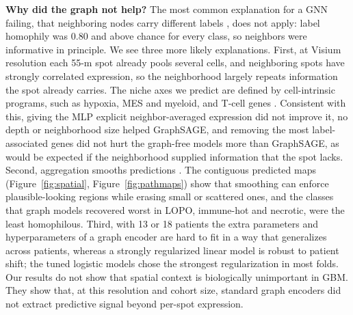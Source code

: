 \documentclass[11pt,letterpaper]{article}
\begin{document}
\textbf{Why did the graph not help?} The most common explanation for a GNN failing, that neighboring nodes carry different labels \cite{zhu2020homophily}, does not apply: label homophily was 0.80 and above chance for every class, so neighbors were informative in principle. We see three more likely explanations. First, at Visium resolution each 55-\textmu m spot already pools several cells, and neighboring spots have strongly correlated expression, so the neighborhood largely repeats information the spot already carries. The niche axes we predict are defined by cell-intrinsic programs, such as hypoxia, MES and myeloid, and T-cell genes \cite{neftel2019,greenwald2024}. Consistent with this, giving the MLP explicit neighbor-averaged expression did not improve it, no depth or neighborhood size helped GraphSAGE, and removing the most label-associated genes did not hurt the graph-free models more than GraphSAGE, as would be expected if the neighborhood supplied information that the spot lacks. Second, aggregation smooths predictions \cite{li2018deeper}. The contiguous predicted maps (Figure~\ref{fig:spatial}, Figure~\ref{fig:pathmaps}) show that smoothing can enforce plausible-looking regions while erasing small or scattered ones, and the classes that graph models recovered worst in LOPO, immune-hot and necrotic, were the least homophilous. Third, with 13 or 18 patients the extra parameters and hyperparameters of a graph encoder are hard to fit in a way that generalizes across patients, whereas a strongly regularized linear model is robust to patient shift; the tuned logistic models chose the strongest regularization in most folds. Our results do not show that spatial context is biologically unimportant in GBM. They show that, at this resolution and cohort size, standard graph encoders did not extract predictive signal beyond per-spot expression.
\end{document}

